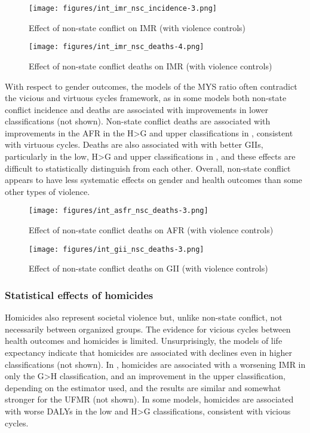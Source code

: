 \documentclass[12pt]{article}
\begin{document}
\begin{figure}[!htb]
    \centering
    \caption{Effect of non-state conflict on IMR (with violence controls)}
    \label{int_imr_nsc_incidence}
    \texttt{[image: figures/int\_imr\_nsc\_incidence-3.png]}
\end{figure}
\begin{figure}[!htb]
    \centering
    \caption{Effect of non-state conflict deaths on IMR (with violence controls)}
    \label{int_imr_nsc_deaths}
    \texttt{[image: figures/int\_imr\_nsc\_deaths-4.png]}
\end{figure}

With respect to gender outcomes, the models of the MYS ratio often contradict the vicious and virtuous cycles framework, as in some models both non-state conflict incidence and deaths are associated with improvements in lower classifications (not shown).
Non-state conflict deaths are associated with improvements in the AFR in the H>G and upper classifications in , consistent with virtuous cycles.
Deaths are also associated with with better GIIs, particularly in the low, H>G and upper classifications in , and these effects are difficult to statistically distinguish from each other.
Overall, non-state conflict appears to have less systematic effects on gender and health outcomes than some other types of violence.

\begin{figure}[!htb]
    \centering
    \caption{Effect of non-state conflict deaths on AFR (with violence controls)}
    \label{int_asfr_nsc_deaths}
    \texttt{[image: figures/int\_asfr\_nsc\_deaths-3.png]}
\end{figure}

\begin{figure}[!htb]
    \centering
    \caption{Effect of non-state conflict deaths on GII (with violence controls)}
    \label{int_gii_nsc_deaths}
    \texttt{[image: figures/int\_gii\_nsc\_deaths-3.png]}
\end{figure}

\subsubsection{Statistical effects of homicides}

Homicides also represent societal violence but, unlike non-state conflict, not necessarily between organized groups.
The evidence for vicious cycles between health outcomes and homicides is limited.
Unsurprisingly, the models of life expectancy indicate that homicides are associated with declines even in higher classifications (not shown).
In , homicides are associated with a worsening IMR in only the G>H classification, and an improvement in the upper classification, depending on the estimator used, and the results are similar and somewhat stronger for the UFMR (not shown).
In some models, homicides are associated with worse DALYs in the low and H>G classifications, consistent with vicious cycles.
\end{document}
